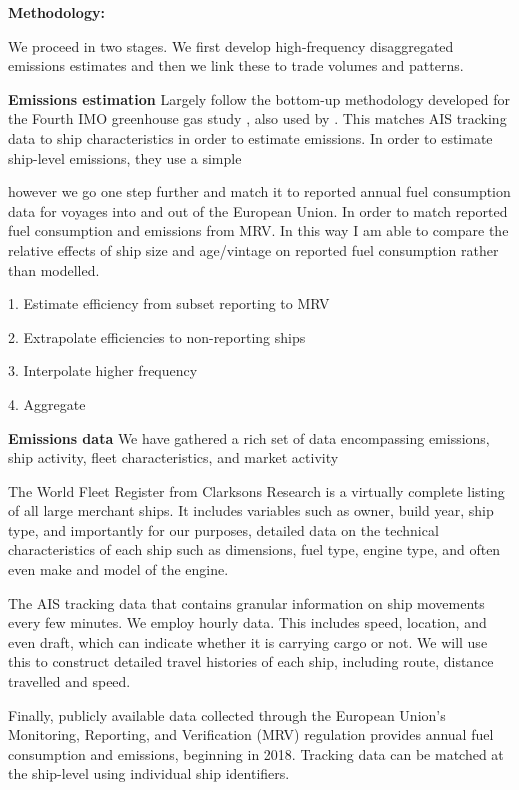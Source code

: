 \documentclass[hidelinks, 12pt,letterpaper]{article}
\begin{document}
\smallskip 

\noindent \textbf{Methodology:}  

We proceed in two stages. We first develop high-frequency disaggregated emissions estimates and then we link these to trade volumes and patterns.

\textbf{Emissions estimation}
Largely follow the bottom-up methodology developed for the Fourth IMO greenhouse gas study \citep{faber2020fourth}, also used by \citet{olmer2017greenhouse, johansson2017global, jalkanen2009modelling, van2018spatially}. This matches AIS tracking data to ship characteristics in order to estimate emissions. In order to estimate ship-level emissions, they use a simple 

however we go one step further and match it to reported annual fuel consumption data for voyages into and out of the European Union. In order to match reported fuel consumption and emissions from MRV. In this way I am able to compare the relative effects of ship size and age/vintage on reported fuel consumption rather than modelled.


1. Estimate efficiency from subset reporting to MRV

2. Extrapolate efficiencies to non-reporting ships

3. Interpolate higher frequency

4. Aggregate

\textbf{Emissions data}
We have gathered a rich set of data encompassing emissions, ship activity, fleet characteristics, and market activity

The World Fleet Register from Clarksons Research is a virtually complete listing of all large merchant ships. It includes variables such as owner, build year, ship type, and importantly for our purposes, detailed data on the technical characteristics of each ship such as dimensions, fuel type, engine type, and often even make and model of the engine. 

The AIS tracking data that contains granular information on ship movements every few minutes. We employ hourly data. This includes speed, location, and even draft, which can indicate whether it is carrying cargo or not. We will use this to construct detailed travel histories of each ship, including route, distance travelled and speed. 

Finally, publicly available data collected through the European Union's Monitoring, Reporting, and Verification (MRV) regulation provides annual fuel consumption and emissions, beginning in 2018. Tracking data can be matched at the ship-level using individual ship identifiers.
\end{document}
